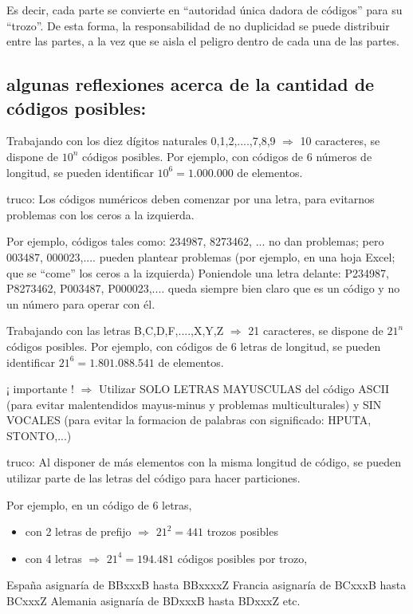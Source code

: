 \documentclass[spanish,12pt,a4paper,final,oneside]{book}
\begin{document}
Es decir, cada parte se convierte en ``autoridad única dadora de códigos'' para su ``trozo''. De esta forma, la responsabilidad de no duplicidad se puede distribuir entre las partes, a la vez que se aisla el peligro dentro de cada una de las partes. 


\subsection{algunas reflexiones acerca de la cantidad de códigos posibles:}
Trabajando con los diez dígitos naturales 0,1,2,....,7,8,9 $\Rightarrow$ 10 caracteres, se dispone de $10^n$ códigos posibles. Por ejemplo, con códigos de 6 números de longitud, se pueden identificar $10^6 = 1.000.000$ de elementos.

truco: Los códigos numéricos deben comenzar por una letra, para evitarnos problemas con los ceros a la izquierda.

Por ejemplo, códigos tales como:  234987, 8273462, ...  no dan problemas; pero 003487, 000023,.... pueden plantear problemas  (por ejemplo, en una hoja Excel; que se ``come'' los ceros a la izquierda) Poniendole una letra delante: P234987, P8273462, P003487, P000023,.... queda siempre bien claro que es un código y no un número para operar con él.

\vspace{0.5cm}
Trabajando con las letras B,C,D,F,....,X,Y,Z $\Rightarrow$ 21 caracteres, se dispone de $21^n$ códigos posibles. Por ejemplo, con códigos de 6 letras de longitud, se pueden identificar $21^6 = 1.801.088.541$ de elementos.

¡ importante ! $\Rightarrow$ Utilizar SOLO LETRAS MAYUSCULAS del código ASCII (para evitar malentendidos mayus-minus y problemas multiculturales) y SIN VOCALES (para evitar la formacion de palabras con significado: HPUTA, STONTO,...)

truco: Al disponer de más elementos con la misma longitud de código, se pueden utilizar parte de las letras del código para hacer particiones. 

Por ejemplo, en un código de 6 letras,
\begin{itemize}
\item con 2 letras de prefijo $\Rightarrow$ $21^2 = 441$ trozos posibles 
\item con 4 letras $\Rightarrow$ $21^4 = 194.481$ códigos posibles por trozo,
\end{itemize}
España asignaría de BBxxxB hasta BBxxxxZ
Francia asignaría de BCxxxB hasta BCxxxZ
Alemania asignaría de BDxxxB hasta BDxxxZ
etc.
\end{document}
